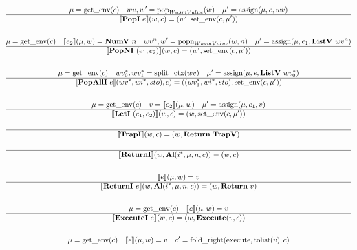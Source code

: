 \begin{gather*}
  \mu = \getenv(c) \quad
  wv, w' = \pop_{WasmValue}(w) \quad
  \mu' = \assign(\mu, e, wv) \\
  \hline
  \sem{\popi ~ e}(w, c) = (w', \setenv(c, \mu')) \\
%
\newline \\
  \mu = \getenv(c) \quad
  \sem{e_2}(\mu, w) = \numv ~ n \quad
  wv^n, w' = \popn_{WasmValue}(w, n) \quad
  \mu' = \assign(\mu, e_1, \listv ~ wv^n) \\
  \hline
  \sem{\popni ~ (e_1, e_2)}(w, c) = (w', \setenv(c, \mu')) \\
%
\newline \\
  \mu = \getenv(c) \quad
  \seq{wv_0}, \seq{wv_1} = \splitctx(wv) \quad
  \mu' = \assign(\mu, e, \listv ~ \seq{wv_0}) \\
  \hline
  \sem{\popalli ~ e}(\seq{wv}, \seq{wi}, sto), c)
  =
  ((\seq{wv_1}, \seq{wi}, sto), \setenv(c, \mu')) \\
%
\newline \\
  \mu = \getenv(c) \quad
  v = \sem{e_2}(\mu, w) \quad
  \mu' = \assign(\mu, e_1, v) \\
  \hline
  \sem{\leti ~ (e_1, e_2)}(w, c)
  =
  (w, \setenv(c, \mu')) \\
%
\newline \\
  \hline
  \sem{\trapi}(w, c) = (w, \ret ~ \trapv) \\
%
\newline \\
  \hline
  \sem{\returni}(w, \al (\seq{i}, \mu, n, c)) = (w, c) \\
%
\newline \\
  \sem{e}(\mu, w) = v \\
  \hline
  \sem{\returni ~ e}(w, \al (\seq{i}, \mu, n, c)) = (w, \ret ~ v) \\
%
\newline \\
  \mu = \getenv(c) \quad
  \sem{e}(\mu, w) = v \\
  \hline
  \sem{\executei ~ e}(w, c) = (w, \exe (v, c)) \\
%
\newline \\
  \mu = \getenv(c) \quad
  \sem{e}(\mu, w) = v \quad
  c' = \foldright(\execute, \tolist(v), c) \\

\end{gather*}
